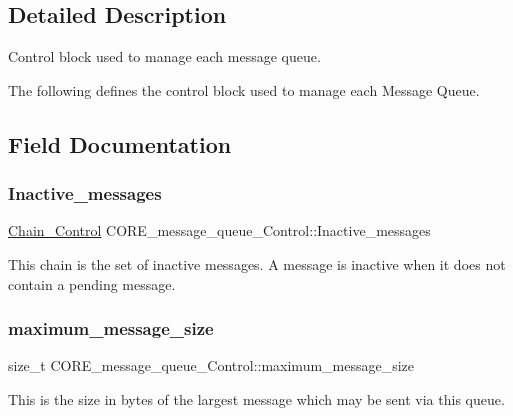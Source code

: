\subsection{Detailed Description}
Control block used to manage each message queue. 

The following defines the control block used to manage each Message Queue. 

\subsection{Field Documentation}
\mbox{\label{structCORE__message__queue__Control_a2f5da79e2c1094cc5ee810c98579d406}} 
\subsubsection{\texorpdfstring{Inactive\_messages}{Inactive\_messages}}
{\footnotesize\ttfamily \mbox{\hyperlink{unionChain__Control}{Chain\+\_\+\+Control}} C\+O\+R\+E\+\_\+message\+\_\+queue\+\_\+\+Control\+::\+Inactive\+\_\+messages}

This chain is the set of inactive messages. A message is inactive when it does not contain a pending message. \mbox{\label{structCORE__message__queue__Control_a59b5fa85a2ecca32875957b854f17d88}} 
\subsubsection{\texorpdfstring{maximum\_message\_size}{maximum\_message\_size}}
{\footnotesize\ttfamily size\+\_\+t C\+O\+R\+E\+\_\+message\+\_\+queue\+\_\+\+Control\+::maximum\+\_\+message\+\_\+size}

This is the size in bytes of the largest message which may be sent via this queue. \mbox{\label{structCORE__message__queue__Control_ae211827749d269377efe4b537dcbd08f}} 
